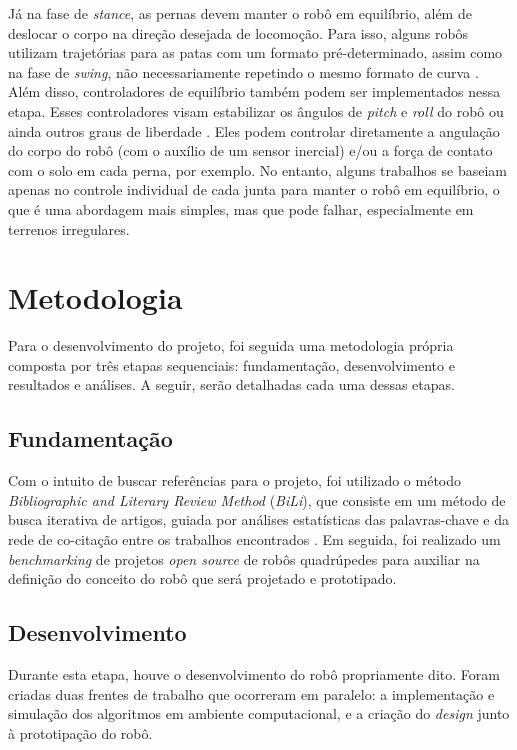 \documentclass[conference]{IEEEtran}
\begin{document}
Já na fase de \textit{stance}, as pernas devem manter o robô em equilíbrio, além de deslocar o corpo na direção desejada de locomoção. Para isso, alguns robôs utilizam trajetórias para as patas com um formato pré-determinado, assim como na fase de \textit{swing}, não necessariamente repetindo o mesmo formato de curva \cite{X.118, X.58}. Além disso, controladores de equilíbrio também podem ser implementados nessa etapa. Esses controladores visam estabilizar os ângulos de \textit{pitch} e \textit{roll} do robô \cite{Shi2021, StanfordPupper, HackadayQuadruped, Notspot} ou ainda outros graus de liberdade \cite{X.134, Chen2020140736, Zhang2016284}. Eles podem controlar diretamente a angulação do corpo do robô (com o auxílio de um sensor inercial) e/ou a força de contato com o solo em cada perna, por exemplo. No entanto, alguns trabalhos se baseiam apenas no controle individual de cada junta para manter o robô em equilíbrio, o que é uma abordagem mais simples, mas que pode falhar, especialmente em terrenos irregulares.

\section{Metodologia}
Para o desenvolvimento do projeto, foi seguida uma metodologia própria composta por três etapas sequenciais: fundamentação, desenvolvimento e resultados e análises. A seguir, serão detalhadas cada uma dessas etapas.

  \subsection{Fundamentação}
  Com o intuito de buscar referências para o projeto, foi utilizado o método \textit{Bibliographic and Literary Review Method} (\textit{BiLi}), que consiste em um método de busca iterativa de artigos, guiada por análises estatísticas das palavras-chave e da rede de co-citação entre os trabalhos encontrados \cite{bili}. Em seguida, foi realizado um \textit{benchmarking} de projetos \textit{open source} de robôs quadrúpedes para auxiliar na definição do conceito do robô que será projetado e prototipado.
  
  \subsection{Desenvolvimento}
  Durante esta etapa, houve o desenvolvimento do robô propriamente dito. Foram criadas duas frentes de trabalho que ocorreram em paralelo: a implementação e simulação dos algoritmos em ambiente computacional, e a criação do \textit{design} junto à prototipação do robô.
\end{document}
